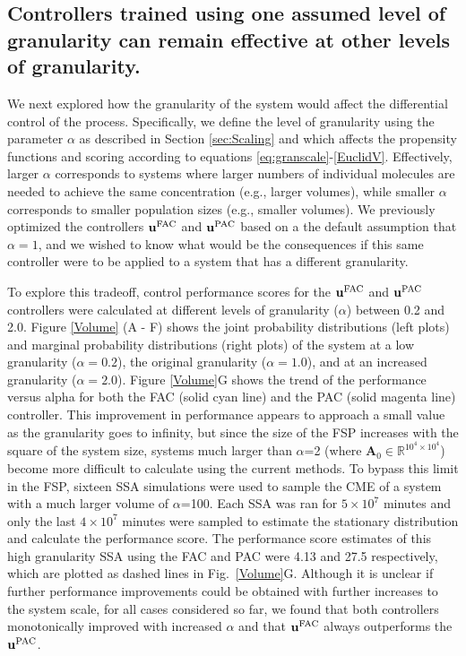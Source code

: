 \documentclass[12pt]{iopart}
\begin{document}
\subsection{Controllers trained using one assumed level of granularity can remain effective at other levels of granularity.}

We next explored how the granularity of the system would affect the differential control of the process. Specifically, we define the level of granularity using the parameter $\alpha$ as described in Section \ref{sec:Scaling} and which affects the propensity functions and scoring according to equations \ref{eq:granscale}-\ref{EuclidV}. Effectively, larger $\alpha$ corresponds to systems where larger numbers of individual molecules are needed to achieve the same concentration (e.g., larger volumes), while smaller $\alpha$ corresponds to smaller population sizes (e.g., smaller volumes). We previously optimized the controllers $\mathbf{u}^{\rm FAC}$ and $\mathbf{u}^{\rm PAC}$ based on a the default assumption that $\alpha=1$, and we wished to know what would be the consequences if this same controller were to be applied to a system that has a different granularity. 

To explore this tradeoff, control performance scores for the $\mathbf{u}^{\rm FAC}$ and $\mathbf{u}^{\rm PAC}$ controllers were calculated at different levels of granularity ($\alpha$) between 0.2 and 2.0.  Figure \ref{Volume} (A - F) shows the joint probability distributions (left plots) and marginal probability distributions (right plots) of the system at a low granularity ($\alpha=0.2$), the original granularity ($\alpha=1.0$), and at an increased granularity ($\alpha=2.0$). 
Figure \ref{Volume}G shows the trend of the performance versus alpha for both the FAC (solid cyan line) and the PAC (solid magenta line) controller.  This improvement in performance appears to approach a small value as the granularity goes to infinity, but since the size of the FSP increases with the square of the system size, systems much larger than $\alpha$=2 (where $\mathbf{A}_0\in \mathbb{R}^{10^4\times10^4}$) become more difficult to calculate using the current methods. To bypass this limit in the FSP, sixteen SSA simulations were used to sample the CME of a system with a much larger volume of $\alpha$=100. Each SSA was ran for $5\times10^7$ minutes and only the last $4\times10^7$ minutes were sampled to estimate the stationary distribution and calculate the performance score. The performance score estimates of this high granularity SSA using the FAC and PAC were 4.13 and 27.5 respectively, which are plotted as dashed lines in Fig.\ \ref{Volume}G. Although it is unclear if further performance improvements could be obtained with further increases to the system scale, for all cases considered so far, we found that both controllers monotonically improved with increased $\alpha$ and that $\mathbf{u}^{\rm FAC}$ always outperforms the $\mathbf{u}^{\rm PAC}$. 
\end{document}

